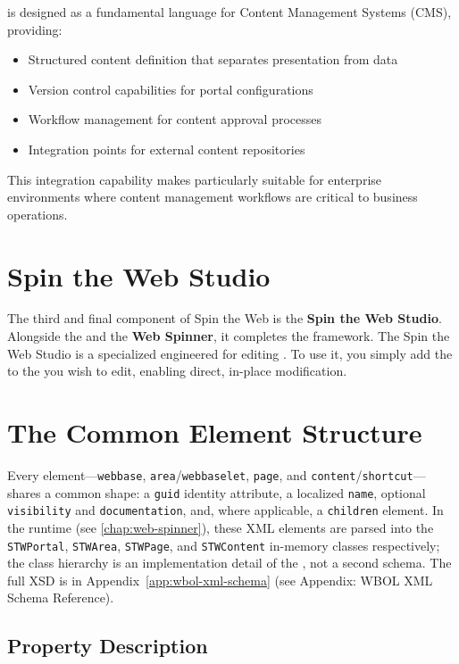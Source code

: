 \wbol{} is designed as a fundamental language for Content Management Systems (CMS), providing:

\begin{itemize}
\item Structured content definition that separates presentation from data
\item Version control capabilities for portal configurations
\item Workflow management for content approval processes
\item Integration points for external content repositories
\end{itemize}

This integration capability makes \wbol{} particularly suitable for enterprise environments where content management workflows are critical to business operations.

\section{Spin the Web Studio}
\label{sec:studio}

The third and final component of Spin the Web is the \textbf{Spin the Web Studio}. Alongside the \textbf{\wbol{}} and the \textbf{Web Spinner}, it completes the framework. The Spin the Web Studio is a specialized \webbaselet{} engineered for editing . To use it, you simply add the \webbaselet{} to the \webbase{} you wish to edit, enabling direct, in-place modification.

\section{The Common Element Structure}
\label{sec:stwelement-base}

Every \wbol{} element---\texttt{webbase}, \texttt{area}/\texttt{webbaselet}, \texttt{page}, and \texttt{content}/\texttt{shortcut}---shares a common shape: a \texttt{guid} identity attribute, a localized \texttt{name}, optional \texttt{visibility} and \texttt{documentation}, and, where applicable, a \texttt{children} element. In the runtime (see \cref{chap:web-spinner}), these XML elements are parsed into the \texttt{STWPortal}, \texttt{STWArea}, \texttt{STWPage}, and \texttt{STWContent} in-memory classes respectively; the class hierarchy is an implementation detail of the \webspinner{}, not a second schema. The full XSD is in Appendix~\ref{app:wbol-xml-schema} (see Appendix: WBOL XML Schema Reference).

\subsection{Property Description}

